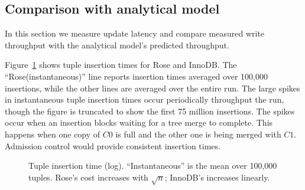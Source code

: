 \documentclass{vldb}
\newcommand{\rows}{Rose\xspace}
\newcommand{\rowss}{Rose's\xspace}
\newcommand{\xxx}[1]{\textcolor{red}{\bf XXX: #1}}
\renewcommand{\xxx}[1]{\xspace}
\begin{document}


\subsection{Comparison with analytical model}

In this section we measure update latency and compare
measured write throughput with the analytical model's predicted
throughput.

Figure~\ref{fig:avg-tup} shows tuple insertion times for \rows and InnoDB.
The ``\rows (instantaneous)'' line reports insertion times
averaged over 100,000 insertions, while the other lines are averaged
over the entire run.  The large spikes in instantaneous tuple
insertion times occur periodically throughput the run, though the
figure is truncated to show the first 75 million insertions.\xxx{show
  the whole run???}  The spikes occur when an insertion blocks waiting
for a tree merge to complete.  This happens when one copy of $C0$ is
full and the other one is being merged with $C1$.  Admission control
would provide consistent insertion times.

\begin{figure}
\centering
{}
\caption{Tuple insertion time (log).  ``Instantaneous'' is the mean over 100,000
  tuples.  \rowss cost increases with $\sqrt{n}$; InnoDB's increases linearly.}
\label{fig:avg-tup}
\end{figure}

\end{document}
